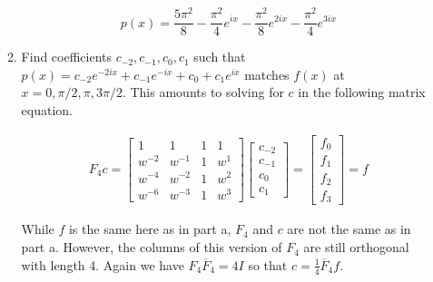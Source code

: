 \documentclass[a4paper]{article}
\begin{document}
\begin{enumerate}
\begin{enumerate}
	 $$
	 \boxed{
	 p(x)= 
	 \frac{5\pi^2}{8} -\frac{\pi^2}{4}e^{ix} -\frac{\pi^2}{8}e^{2ix} 
	 -\frac{\pi^2}{4}e^{3ix}
	 }
	 $$
	 
	 \newpage
	 
	 
	 \item
	 Find coefficients $c_{-2}, c_{-1}, c_0, c_1$ such
	 that $p(x) =  c_{-2}e^{-2ix} + c_{-1}e^{-ix} + c_0 + c_1e^{ix}$
	 matches $f(x)$ at $x = 0, \pi/2, \pi, 3\pi /2$. This amounts to 
	 solving for $c$ in the following matrix equation. 
	 
	 \begin{align*}
	 F_4c = 
	 \begin{bmatrix}
	 1 & 1 & 1 & 1\\
	 w^{-2} & w^{-1} & 1 & w^1 \\
	 w^{-4} & w^{-2} & 1 & w^2 \\
	 w^{-6} & w^{-3} & 1 & w^3
	 \end{bmatrix}
	 \begin{bmatrix}
	 c_{-2}\\ c_{-1} \\ c_0 \\ c_1
	 \end{bmatrix}
	 = 
	 \begin{bmatrix}
	 f_0 \\ f_1 \\ f_2 \\ f_3
	 \end{bmatrix} = f
	 \end{align*}
	 
	 While $f$ is the same here as in part a, $F_4$ and $c$ are not the
	 same as in part a. However, the columns of this version of $F_4$
	 are still orthogonal with length 4. Again we have 
	$F_4 \overline{F}_4 = 4I$ so that $c = \frac{1}{4}\overline{F}_4f$.
	

\end{enumerate}
\end{enumerate}
\end{document}
